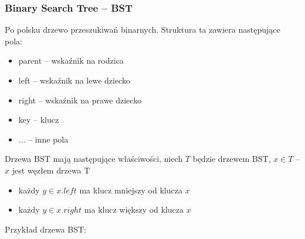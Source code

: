 \documentclass[11pt,a4paper]{article}
\begin{document}
\subsubsection{Binary Search Tree -- BST}
Po polsku drzewo przeszukiwań binarnych. Struktura ta zawiera następujące pola:
\begin{itemize}
    \item parent -- wskaźnik na rodzica
    \item left -- wskaźnik na lewe dziecko
    \item right -- wskaźnik na prawe dziecko
    \item key -- klucz
    \item ... -- inne pola
\end{itemize}
Drzewa BST mają następujące właściwości, niech $T$ będzie drzewem BST, $x \in T$ -- $x$ jest węzłem drzewa T
\begin{itemize}
    \item każdy $y \in x.left$ ma klucz mniejszy od klucza $x$
    \item każdy $y \in x.right$ ma klucz większy od klucza $x$
\end{itemize}

Przykład drzewa BST:
\begin{center}
\end{center}
\end{document}

